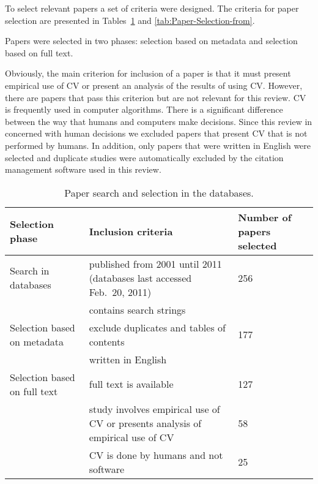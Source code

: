 To select relevant papers a set of criteria were designed. The criteria for paper selection are presented in Tables~\ref{tab:Paper-search-and} and \ref{tab:Paper-Selection-from}.

Papers were selected in two phases: selection based on metadata and selection based on full text.

Obviously, the main criterion for inclusion of a paper is that it must present empirical use of CV or present an analysis of the results of using CV. However, there are papers that pass this criterion but are not relevant for this review. CV is frequently used in computer algorithms. There is a significant difference between the way that humans and computers make decisions. Since this review in concerned with human decisions we excluded papers that present CV that is not performed by humans. In addition, only papers that were written in English were selected and duplicate studies were automatically excluded by the citation management software used in this review.


\begin{table}
	\scriptsize
\caption{\label{tab:Paper-search-and}Paper search and selection in the databases.}

\begin{tabular}{|>{\raggedright}p{}|>{\raggedright}p{}|>{\raggedright}p{}|}
\hline
Selection phase & Inclusion criteria & Number of papers selected\tabularnewline
\hline \hline

Search in databases & published from 2001 until 2011 (databases last accessed Feb.\ 20, 2011) & 256 \tabularnewline
\cline{2-2}
& contains search strings & \tabularnewline
\hline 

Selection based on metadata & exclude duplicates and tables of contents& 177 \tabularnewline
\cline{2-2}
&  written in English  & \tabularnewline
\hline

Selection based on full text & full text is available & 127 \tabularnewline
\cline{2-3}
& study involves empirical use of CV or presents analysis of empirical use of CV & 58 \tabularnewline
\cline{2-3}
& CV is done by humans and not software & 25 \tabularnewline
\hline
\end{tabular}%
\end{table}


